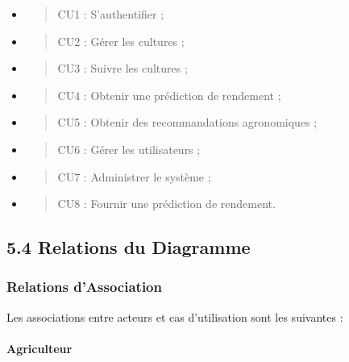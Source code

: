 \documentclass[
]{article}
\begin{document}
\begin{itemize}
\item
  \begin{quote}
  CU1 : S'authentifier ;
  \end{quote}
\item
  \begin{quote}
  CU2 : Gérer les cultures ;
  \end{quote}
\item
  \begin{quote}
  CU3 : Suivre les cultures ;
  \end{quote}
\item
  \begin{quote}
  CU4 : Obtenir une prédiction de rendement ;
  \end{quote}
\item
  \begin{quote}
  CU5 : Obtenir des recommandations agronomiques ;
  \end{quote}
\item
  \begin{quote}
  CU6 : Gérer les utilisateurs ;
  \end{quote}
\item
  \begin{quote}
  CU7 : Administrer le système ;
  \end{quote}
\item
  \begin{quote}
  CU8 : Fournir une prédiction de rendement.
  \end{quote}
\end{itemize}

\hypertarget{relations-du-diagramme}{%
\subsection{5.4 Relations du Diagramme}\label{relations-du-diagramme}}

\hypertarget{relations-dassociation}{%
\subsubsection{Relations d'Association}\label{relations-dassociation}}

Les associations entre acteurs et cas d'utilisation sont les suivantes :

\hypertarget{agriculteur-1}{%
\paragraph{Agriculteur}\label{agriculteur-1}}
\end{document}
